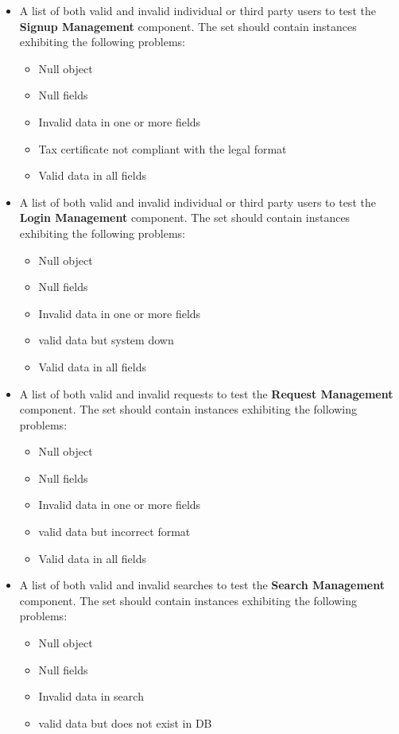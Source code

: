 \documentclass[a4paper, hidelinks, 12pt]{report}
\begin{document}
\begin{itemize}
\item{} A list of both valid and invalid individual or third party users to test the \textbf{Signup Management} component. The set should contain instances exhibiting the following problems:
\begin{itemize}
\item{} Null object
\item{} Null fields
\item{} Invalid data in one or more fields
\item{} Tax certificate not compliant with the legal format
\item{} Valid data in all fields
\end{itemize}
\item{} A list of both valid and invalid individual or third party users to test the \textbf{Login Management} component. The set should contain instances exhibiting the following problems:
\begin{itemize}
\item{} Null object
\item{} Null fields
\item{} Invalid data in one or more fields
\item{} valid data but system down
\item{} Valid data in all fields
\end{itemize}
\item{} A list of both valid and invalid requests to test the \textbf{Request Management} component. The set should contain instances exhibiting the following problems:
\begin{itemize}
\item{} Null object
\item{} Null fields
\item{} Invalid data in one or more fields
\item{} valid data but incorrect format
\item{} Valid data in all fields
\end{itemize}
\item{} A list of both valid and invalid searches to test the \textbf{Search Management} component. The set should contain instances exhibiting the following problems:
\begin{itemize}
\item{} Null object
\item{} Null fields
\item{} Invalid data in search
\item{} valid data but does not exist in DB

\end{itemize}
\end{itemize}
\end{document}
